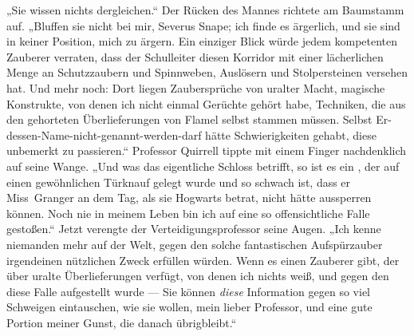 „Sie wissen nichts dergleichen.“ Der Rücken des Mannes richtete am Baumstamm auf.
„Bluffen sie nicht bei mir, Severus Snape; ich finde es ärgerlich, und sie sind in keiner Position, mich zu ärgern. Ein einziger Blick würde jedem kompetenten Zauberer verraten, dass der Schulleiter diesen Korridor mit einer lächerlichen Menge an Schutzzaubern und Spinnweben, Auslösern und Stolpersteinen versehen hat. Und mehr noch: Dort liegen Zaubersprüche von uralter Macht, magische Konstrukte, von denen ich nicht einmal Gerüchte gehört habe, Techniken, die aus den gehorteten Überlieferungen von Flamel selbst stammen müssen. Selbst Er-dessen-Name-nicht-genannt-werden-darf hätte Schwierigkeiten gehabt, diese unbemerkt zu passieren.“ Professor Quirrell tippte mit einem Finger nachdenklich auf seine Wange.
„Und was das eigentliche Schloss betrifft, so ist es ein , der auf einen gewöhnlichen Türknauf gelegt wurde und so schwach ist, dass er Miss~Granger an dem Tag, als sie Hogwarts betrat, nicht hätte aussperren können. Noch nie in meinem Leben bin ich auf eine so offensichtliche Falle gestoßen.“ Jetzt verengte der Verteidigungsprofessor seine Augen.
„Ich kenne niemanden mehr auf der Welt, gegen den solche fantastischen Aufspürzauber irgendeinen nützlichen Zweck erfüllen würden. Wenn es einen Zauberer gibt, der über uralte Überlieferungen verfügt, von denen ich nichts weiß, und gegen den diese Falle aufgestellt wurde — Sie können \emph{diese} Information gegen so viel Schweigen eintauschen, wie sie wollen, mein lieber Professor, und eine gute Portion meiner Gunst, die danach übrigbleibt.“

